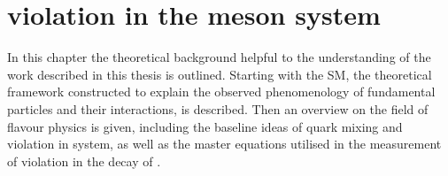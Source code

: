 
\chapter[
  head={\CP violation in the \Bd meson system},
  tocentry={\CPbfsf violation in the \Bdbfsf meson system}
]
{\CPbfsf violation in the \Bdbfsf meson system}
\label{ch:cpv_theory}

In this chapter the theoretical background helpful to the understanding of the
work described in this thesis is outlined. Starting with the \acl*{SM}, the
theoretical framework constructed to explain the observed phenomenology of
fundamental particles and their interactions, is described. Then an overview on
the field of flavour physics is given, including the baseline ideas of quark
mixing and \CP violation in \Bmeson system, as well as the master equations
utilised in the measurement of \CP violation in the decay of \BdToJpsiKS.






